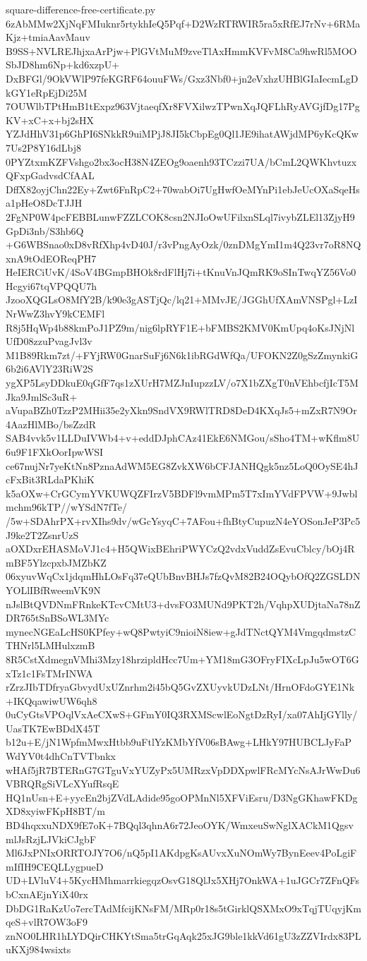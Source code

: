 \documentclass[11pt]{article}
\theoremstyle{definition}
\theoremstyle{remark}
\begin{document}
\begin{filecontents*}[overwrite]{square-difference-free-certificate.py}
6zAbMMw2XjNqFMIuknr5rtykhIeQ5Pqf+D2WzRTRWIR5ra5xRfEJ7rNv+6RMaKjz+tmiaAavMauv
B9SS+NVLREJhjxaArPjw+PlGVtMuM9zveTlAxHmmKVFvM8Ca9hwRl5MOOSbJD8hm6Np+kd6xzpU+
DxBFGl/9OkVWlP97feKGRF64ouuFWs/Gxz3Nbf0+jn2eVxhzUHBlGIaIecmLgDkGY1eRpEjDi25M
7OUWlbTPtHmB1tExpz963VjtaeqfXr8FVXilwzTPwnXqJQFLhRyAVGjfDg17PgKV+xC+x+bj2sHX
YZJdHhV31p6GhPI6SNkkR9uiMPjJ8JI5kCbpEg0Ql1JE9ihatAWjdMP6yKcQKw7Us2P8Y16dLbj8
0PYZtxmKZFVshgo2bx3ocH38N4ZEOg9oaenh93TCzzi7UA/bCmL2QWKhvtuzxQFxpGadvsdCfAAL
DffX82oyjChn22Ey+Zwt6FnRpC2+70wabOi7UgHwfOeMYnPi1ebJeUcOXaSqeHsa1pHeO8DcTJJH
2FgNP0W4pcFEBBLunwFZZLCOK8csn2NJIoOwUFilxnSLql7ivybZLEl13ZjyH9GpDi3nb/S3hb6Q
+G6WBSnao0xD8vRfXhp4vD40J/r3vPngAyOzk/0znDMgYmI1m4Q23vr7oR8NQxnA9tOdEOReqPH7
HeIERCiUvK/4SoV4BGmpBHOk8rdFlHj7i+tKnuVnJQmRK9oSInTwqYZ56Vo0Hcgyi67tqVPQQU7h
JzooXQGLsO8MfY2B/k90e3gASTjQc/lq21+MMvJE/JGGhUfXAmVNSPgl+LzINrWwZ3hvY9kCEMFl
R8j5HqWp4b88kmPoJ1PZ9m/nig6lpRYF1E+bFMBS2KMV0KmUpq4oKsJNjNlUfD08zzuPvagJvl3v
M1B89Rkm7zt/+FYjRW0GnarSuFj6N6k1ibRGdWfQa/UFOKN2Z0gSzZmynkiG6b2i6AVlY23RiW2S
ygXP5LsyDDkuE0qGfF7qs1zXUrH7MZJnIupzzLV/o7X1bZXgT0nVEhbcfjIcT5MJka9JmlSc3uR+
aVupaBZh0TzzP2MHii35e2yXkn9SndVX9RWlTRD8DeD4KXqJs5+mZxR7N9Or4AazHlMBo/bsZzdR
SAB4vvk5v1LLDuIVWb4+v+eddDJphCAz41EkE6NMGou/sSho4TM+wKflm8U6u9F1FXkOorIpwWSI
ce67nujNr7yeKtNn8PznaAdWM5EG8ZvkXW6bCFJANHQgk5nz5LoQ0OySE4hJcFxBit3RLdaPKhiK
k5aOXw+CrGCymYVKUWQZFIrzV5BDFl9vmMPm5T7xImYVdFPVW+9Jwblmchm96kTP//wYSdN7fTe/
/5w+SDAhrPX+rvXIhs9dv/wGcYsyqC+7AFou+fhBtyCupuzN4eYOSonJeP3Pc5J9ke2T2ZsnrUzS
aOXDxrEHASMoVJ1c4+H5QWixBEhriPWYCzQ2vdxVuddZsEvuCblcy/bOj4RmBF5YlzcpxbJMZbKZ
06xyuvWqCx1jdqmHhLOsFq37eQUbBnvBHJs7fzQvM82B24OQybOfQ2ZGSLDNYOLlIBfRweemVK9N
nJslBtQVDNmFRnkeKTcvCMtU3+dvsFO3MUNd9PKT2h/VqhpXUDjtaNa78nZDR765tSnBSoWL3MYc
mynecNGEaLcHS0KPfey+wQ8PwtyiC9nioiN8iew+gJdTNctQYM4VmgqdmstzCTHNrl5LMHulxzmB
8R5CstXdmegnVMhi3Mzy18hrzipldHcc7Um+YM18mG3OFryFIXcLpJu5wOT6GxTz1c1FsTMrINWA
rZrzJIbTDfryaGbvydUxUZnrhm2i45bQ5GvZXUyvkUDzLNt/HrnOFdoGYE1Nk+IKQqawiwUW6qh8
0uCyGtsVPOqlVxAeCXwS+GFmY0IQ3RXMScwlEoNgtDzRyI/xa07AhIjGYlly/UasTK7EwBDdX45T
b12u+E/jN1WpfmMwxHtbb9uFtlYzKMbYfV06sBAwg+LHkY97HUBCLJyFaPWdYV0t4dhCnTVTbnkx
wHAf5jR7BTERnG7GTguVxYUZyPx5UMRzxVpDDXpwlFRcMYcNsAJrWwDu6VBRQRgSiVLcXYufRsqE
HQ1nUsn+E+yycEn2bjZVdLAdide95goOPMnNl5XFViEsru/D3NgGKhawFKDgXD8xyiwFKpH8BT/m
BD4hqxxuNDX9fE7oK+7BQql3qhnA6r72JeoOYK/WmxeuSwNglXACkM1QgsvmlJsRzjLJVkiCJgbF
Ml6JxPNIxORRTOJY7O6/nQ5pI1AKdpgKsAUvxXuNOmWy7BynEeev4PoLgiFmIfIH9CEQLLygpueD
UD+LVluV4+5KycHMhmarrkiegqzOsvG18QlJx5XHj7OnkWA+1uJGCr7ZFnQFsbCxnAEjnYiX40rx
DbDG1RaKzUo7ercTAdMfcijKNsFM/MRp0r18s5tGirklQSXMxO9xTqjTUqyjKmqeS+vlR7OW3oF9
znNO0LHR1hLYDQirCHKYtSma5trGqAqk25xJG9ble1kkVd61gU3zZZVIrdx83PLuKXj984wsixts

\end{filecontents*}
\end{document}
